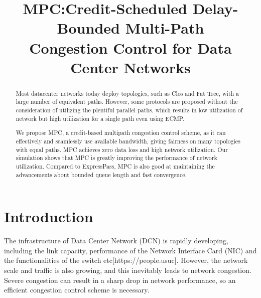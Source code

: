 \documentclass[conference,compsoc]{IEEEtran}
\begin{document}
\title{MPC:Credit-Scheduled Delay-Bounded Multi-Path \\Congestion Control for Data Center Networks }


\author{
\and
{}
\and
{}
}

\maketitle

\begin{abstract}
Most datacenter networks today deploy topologies, such as Clos and Fat Tree, with a large number of equivalent paths. However, some protocols are proposed without the consideration of utilizing the plentiful parallel paths, which results in low utilization of network but high utilization for a single path even using ECMP.

We propose MPC, a credit-based multipath congestion control scheme, as it can effectively and seamlessly use available bandwidth, giving fairness on many topologies with equal paths. MPC achieves zero data loss and high network utilization. Our simulation shows that MPC is greatly improving the performance of network utilization. Compared to ExpressPass, MPC is also good at maintaining the advancements about bounded queue length and fast convergence.
\end{abstract}


\IEEEpeerreviewmaketitle



\section{Introduction}
The infrastructure of Data Center Network (DCN) is rapidly developing, including the link capacity, performance of the Network Interface Card (NIC) and the functionalities of the switch etc[https://people.usuc]. However, the network scale and traffic is also growing, and this inevitably leads to network congestion. Severe congestion can result in a sharp drop in network performance, so an efficient congestion control scheme is necessary.
\end{document}
